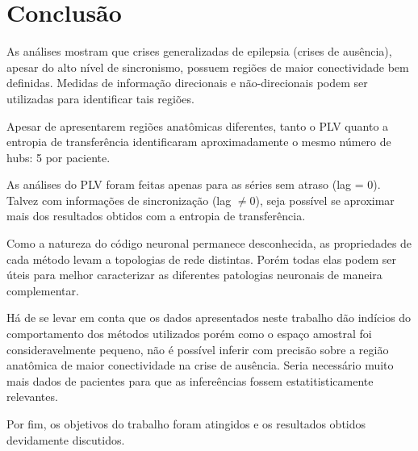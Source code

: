 \documentclass[
	12pt,				%
	openright,			%
	twoside,			%
	a4paper,			%
	english,			%
	french,				%
	spanish,			%
	brazil				%
	]{abntex2}
\begin{document}



\chapter*[Conclusão]{Conclusão}

As análises mostram que crises generalizadas de epilepsia (crises de ausência), apesar do alto nível de sincronismo, possuem regiões de maior conectividade bem definidas. Medidas de informação direcionais e não-direcionais podem ser utilizadas para identificar tais regiões.

Apesar de apresentarem regiões anatômicas diferentes, tanto o PLV quanto a entropia de transferência identificaram aproximadamente o mesmo número de hubs: 5 por paciente.

As análises do PLV foram feitas apenas para as séries sem atraso (lag = 0). Talvez com informações de sincronização (lag $\neq 0$), seja possível se aproximar mais dos resultados obtidos com a entropia de transferência.

Como a natureza do código neuronal permanece desconhecida, as propriedades de cada método levam a topologias de rede distintas. Porém todas elas podem ser úteis para melhor caracterizar as diferentes patologias neuronais de maneira complementar.

Há de se levar em conta que os dados apresentados neste trabalho dão indícios do comportamento dos métodos utilizados porém como o espaço amostral foi consideravelmente pequeno, não é possível inferir com precisão sobre a região anatômica de maior conectividade na crise de ausência. Seria necessário muito mais dados de pacientes para que as infereências fossem estatitisticamente relevantes.

Por fim, os objetivos do trabalho foram atingidos e os resultados obtidos devidamente discutidos.





\end{document}
